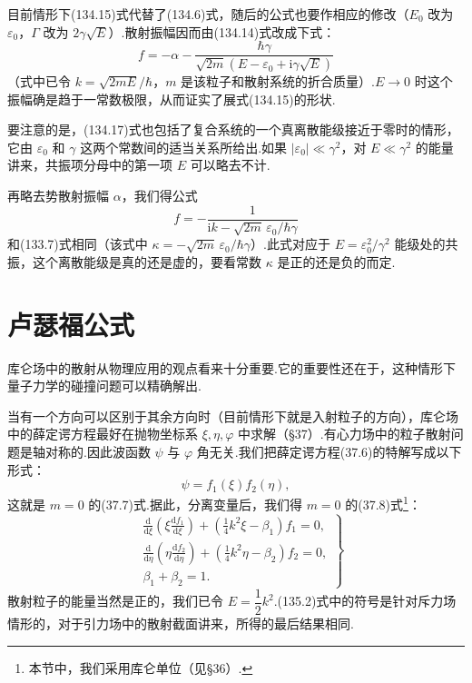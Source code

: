目前情形下(134.15)式代替了(134.6)式，随后的公式也要作相应的修改（$E_0$ 改为 $\varepsilon_0$，$\Gamma$ 改为 $2\gamma\sqrt{E}$）.散射振幅因而由(134.14)式改成下式：
\begin{equation}
  f=-\alpha-\frac{\hbar\gamma}
  {\sqrt{2m}\left(E-\varepsilon_0+\mathrm{i}\gamma\sqrt{E}\right)}
\end{equation}
（式中已令 $k=\sqrt{2mE}/\hbar$，$m$ 是该粒子和散射系统的折合质量）.$E\to0$ 时这个振幅确是趋于一常数极限，从而证实了展式(134.15)的形状.

要注意的是，(134.17)式也包括了复合系统的一个真离散能级接近于零时的情形，它由 $\varepsilon_0$ 和 $\gamma$ 这两个常数间的适当关系所给出.如果 $|\varepsilon_0|\ll\gamma^2$，对 $E\ll\gamma^2$ 的能量讲来，共振项分母中的第一项 $E$ 可以略去不计.

再略去势散射振幅 $\alpha$，我们得公式
\begin{equation*}
  f=-\frac{1}{\mathrm{i}k-\sqrt{2m}\,\varepsilon_0/\hbar\gamma}
\end{equation*}
和(133.7)式相同（该式中 $\kappa=-\sqrt{2m}\,\varepsilon_0/\hbar\gamma$）.此式对应于 $E=\varepsilon_0^2/\gamma^2$ 能级处的共振，这个离散能级是真的还是虚的，要看常数 $\kappa$ 是正的还是负的而定.

\section{卢瑟福公式}

库仑场中的散射从物理应用的观点看来十分重要.它的重要性还在于，这种情形下量子力学的碰撞问题可以精确解出.

当有一个方向可以区别于其余方向时（目前情形下就是入射粒子的方向），库仑场中的薛定谔方程最好在抛物坐标系 $\xi,\eta,\varphi$ 中求解（§37）.有心力场中的粒子散射问题是轴对称的.因此波函数 $\psi$ 与 $\varphi$ 角无关.我们把薛定谔方程(37.6)的特解写成以下形式：
\begin{equation}
  \psi=f_1(\xi)f_2(\eta),
\end{equation}
这就是 $m=0$ 的(37.7)式.据此，分离变量后，我们得 $m=0$ 的(37.8)式\footnote{本节中，我们采用库仑单位（见§36）.}：
\begin{equation}
\left.
\begin{aligned}
  &\frac{\mathrm{d}}{\mathrm{d}\xi}
  \left(\xi\frac{\mathrm{d}f_1}{\mathrm{d}\xi}\right)
  +\left(\frac{1}{4}k^2\xi-\beta_1\right)f_1=0,\\
  &\frac{\mathrm{d}}{\mathrm{d}\eta}
  \left(\eta\frac{\mathrm{d}f_2}{\mathrm{d}\eta}\right)
  +\left(\frac{1}{4}k^2\eta-\beta_2\right)f_2=0,\\
  &\beta_1+\beta_2=1.
\end{aligned}
\right\}
\end{equation}
散射粒子的能量当然是正的，我们已令 $E=\dfrac{1}{2}k^2$.(135.2)式中的符号是针对斥力场情形的，对于引力场中的散射截面讲来，所得的最后结果相同.

